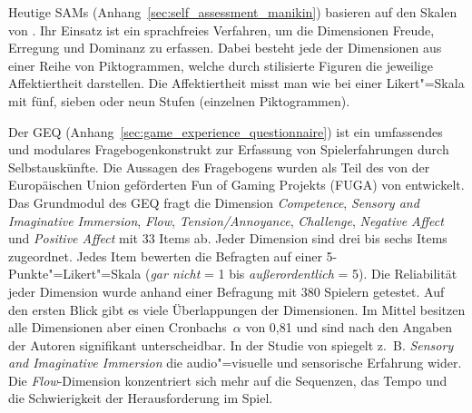 Heutige \ac{SAM}s (Anhang~\ref{sec:self_assessment_manikin}) basieren auf den Skalen von \citet{Lang1980}. Ihr Einsatz ist ein sprachfreies Verfahren, um die Dimensionen Freude, Erregung und Dominanz zu erfassen. Dabei besteht jede der Dimensionen aus einer Reihe von Piktogrammen, welche durch stilisierte Figuren die jeweilige Affektiertheit darstellen. Die Affektiertheit misst man wie bei einer Likert"=Skala mit fünf, sieben oder neun Stufen (einzelnen Piktogrammen). 

Der \ac{GEQ} (Anhang~\ref{sec:game_experience_questionnaire}) ist ein umfassendes und modulares Fragebogenkonstrukt zur Erfassung von Spielerfahrungen durch Selbstauskünfte. Die Aussagen des Fragebogens wurden als Teil des von der Europäischen Union geförderten Fun of Gaming Projekts (FUGA) von \citet{Ijsselsteijn2008} entwickelt. Das Grundmodul des \ac{GEQ} fragt die Dimension \emph{Competence}, \emph{Sensory and Imaginative Immersion}, \emph{Flow}, \emph{Tension/Annoyance}, \emph{Challenge}, \emph{Negative Affect} und \emph{Positive Affect} mit 33 Items ab. Jeder Dimension sind drei bis sechs Items zugeordnet. Jedes Item bewerten die Befragten auf einer 5-Punkte"=Likert"=Skala (\emph{gar nicht} = 1 bis \emph{außerordentlich} = 5). Die Reliabilität jeder Dimension wurde anhand einer Befragung mit 380 Spielern getestet. Auf den ersten Blick gibt es viele Überlappungen der Dimensionen. Im Mittel besitzen alle Dimensionen aber einen Cronbachs~$\alpha$ von 0,81 und sind nach den Angaben der Autoren signifikant unterscheidbar. In der Studie von \citet{Nacke2008} spiegelt z.~B. \emph{Sensory and Imaginative Immersion} die audio"=visuelle und sensorische Erfahrung wider. Die \emph{Flow}-Dimension konzentriert sich mehr auf die Sequenzen, das Tempo und die Schwierigkeit der Herausforderung im Spiel.

